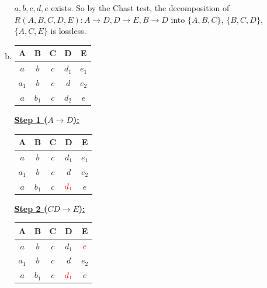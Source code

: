 \documentclass[12pt]{article}
\begin{document}
\begin{enumerate}[1.]
\begin{enumerate}[a)]
        \bigskip

        $a,b,c,d,e$ exists. So by the Chast test, the decomposition of $R(A,B,C,D,E): A \to D, D \to E, B \to D$
        into $\{A,B,C\}$, $\{B,C,D\}$, $\{A,C,E\}$ is lossless.

        \item

        \begin{tabular}{|c|c|c|c|c|}
            \hline
            A & B & C & D & E\\
            \hline
            $a$ & $b$ & $c$ & $d_1$ & $e_1$\\
            \hline
            $a_1$ & $b$ & $c$ & $d$ & $e_2$\\
            \hline
            $a$ & $b_1$ & $c$ & $d_2$ & $e$\\
            \hline
        \end{tabular}

        \underline{\textbf{Step 1 ($A \to D$):}}

        \bigskip

        \begin{tabular}{|c|c|c|c|c|}
            \hline
            A & B & C & D & E\\
            \hline
            $a$ & $b$ & $c$ & $d_1$ & $e_1$\\
            \hline
            $a_1$ & $b$ & $c$ & $d$ & $e_2$\\
            \hline
            $a$ & $b_1$ & $c$ & $\color{red}d_1$ & $e$\\
            \hline
        \end{tabular}

        \bigskip

        \underline{\textbf{Step 2 ($CD \to E$):}}

        \bigskip

        \begin{tabular}{|c|c|c|c|c|}
            \hline
            A & B & C & D & E\\
            \hline
            $a$ & $b$ & $c$ & $d_1$ & $\color{red}e$\\
            \hline
            $a_1$ & $b$ & $c$ & $d$ & $e_2$\\
            \hline
            $a$ & $b_1$ & $c$ & $\color{red}d_1$ & $e$\\
            \hline
        \end{tabular}

        \bigskip


\end{enumerate}
\end{enumerate}
\end{document}
